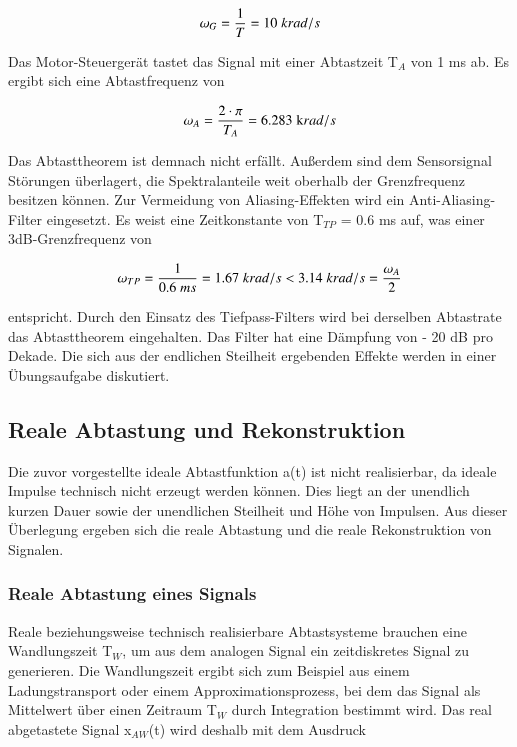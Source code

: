 \begin{equation}\label{eq:twonineteen}
\omega _{G} =\frac{1}{T} =10{\rm \; }krad/s
\end{equation}

\noindent Das Motor-Steuergerät tastet das Signal mit einer Abtastzeit T${}_{A}$ von 1 ms ab. Es ergibt sich eine Abtastfrequenz von 

\begin{equation}\label{eq:twotwenty}
\omega _{A} =\frac{2\cdot \pi }{T_{A} } =6.283{\rm \; k}rad/s
\end{equation}

\noindent Das Abtasttheorem ist demnach nicht erfällt. Au{\ss}erdem sind dem Sensorsignal Störungen überlagert, die Spektralanteile weit oberhalb der Grenzfrequenz besitzen können. Zur Vermeidung von Aliasing-Effekten wird ein Anti-Aliasing-Filter eingesetzt. Es weist eine Zeitkonstante von T$_{TP}$ = 0.6 ms auf, was einer 3dB-Grenzfrequenz von 

\begin{equation}\label{eq:twotwentyone}
\omega _{TP} =\frac{1}{0.6{\rm \; }ms} ={\rm 1.67\; }krad/s<3.14{\rm \; }krad/s=\frac{\omega _{A} }{2}
\end{equation}

\noindent entspricht. Durch den Einsatz des Tiefpass-Filters wird bei derselben Abtastrate das Abtasttheorem eingehalten. Das Filter hat eine Dämpfung von - 20 dB pro Dekade. Die sich aus der endlichen Steilheit ergebenden Effekte werden in einer Übungsaufgabe diskutiert.

\clearpage


\subsection{Reale Abtastung und Rekonstruktion}

\noindent Die zuvor vorgestellte ideale Abtastfunktion a(t) ist nicht realisierbar, da ideale Impulse technisch nicht erzeugt werden können. Dies liegt an der unendlich kurzen Dauer sowie der unendlichen Steilheit und Höhe von Impulsen. Aus dieser Überlegung ergeben sich die reale Abtastung und die reale Rekonstruktion von Signalen.


\subsubsection{Reale Abtastung eines Signals}

\noindent Reale beziehungsweise technisch realisierbare Abtastsysteme brauchen eine Wandlungszeit T$_{W}$, um aus dem analogen Signal ein zeitdiskretes Signal zu generieren. Die Wandlungszeit ergibt sich zum Beispiel aus einem Ladungstransport oder einem Approximationsprozess, bei dem das Signal als Mittelwert über einen Zeitraum T$_{W}$ durch Integration bestimmt wird. Das real abgetastete Signal x$_{AW}$(t) wird deshalb mit dem Ausdruck

